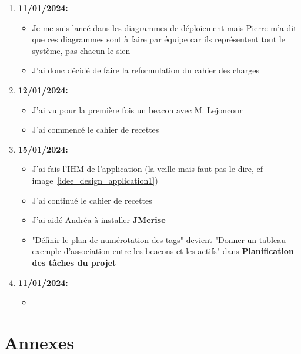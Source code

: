 \documentclass[10pt,a4paper]{article}
\begin{document}
\begin{enumerate}
    \item \textbf{11/01/2024:}
        \begin{itemize}
            \item Je me suis lancé dans les diagrammes de déploiement mais Pierre m'a dit que ces diagrammes sont à faire par équipe car ils représentent tout le système, pas chacun le sien
            \item J'ai donc décidé de faire la reformulation du cahier des charges
        \end{itemize}
    \item \textbf{12/01/2024:}
        \begin{itemize}
            \item J'ai vu pour la première fois un beacon avec M. Lejoncour
            \item J'ai commencé le cahier de recettes
        \end{itemize}
    \item \textbf{15/01/2024:}
        \begin{itemize}
            \item J'ai fais l'IHM de l'application (la veille mais faut pas le dire, cf image~\ref{idee_design_application1})
            \item J'ai continué le cahier de recettes
            \item J'ai aidé Andréa à installer \textbf{JMerise}
            \item "Définir le plan de numérotation des tags" devient "Donner un tableau exemple d'association entre les beacons et les actifs" dans \textbf{Planification des tâches du projet}
        \end{itemize}
    \item \textbf{11/01/2024:}
        \begin{itemize}
            \item 
        \end{itemize}
\end{enumerate}

\newpage

\section{Annexes}
\end{document}
